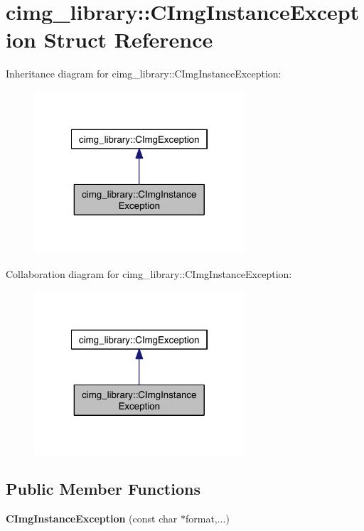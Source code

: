 \hypertarget{structcimg__library_1_1_c_img_instance_exception}{\section{cimg\-\_\-library\-:\-:C\-Img\-Instance\-Exception Struct Reference}
\label{structcimg__library_1_1_c_img_instance_exception}
}


Inheritance diagram for cimg\-\_\-library\-:\-:C\-Img\-Instance\-Exception\-:
\nopagebreak
\begin{figure}[H]
\begin{center}
\leavevmode
\includegraphics[width=222pt]{structcimg__library_1_1_c_img_instance_exception__inherit__graph}
\end{center}
\end{figure}


Collaboration diagram for cimg\-\_\-library\-:\-:C\-Img\-Instance\-Exception\-:
\nopagebreak
\begin{figure}[H]
\begin{center}
\leavevmode
\includegraphics[width=222pt]{structcimg__library_1_1_c_img_instance_exception__coll__graph}
\end{center}
\end{figure}
\subsection*{Public Member Functions}
\begin{DoxyCompactItemize}
\item 
\hypertarget{structcimg__library_1_1_c_img_instance_exception_aebca81f7717bcb50fc530a0c46274ab6}{{\bfseries C\-Img\-Instance\-Exception} (const char $\ast$format,...)}\label{structcimg__library_1_1_c_img_instance_exception_aebca81f7717bcb50fc530a0c46274ab6}

\end{DoxyCompactItemize}
